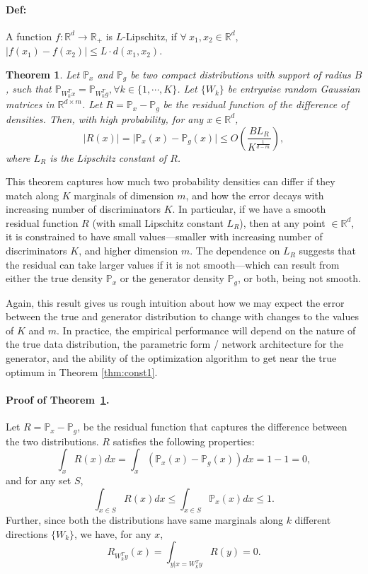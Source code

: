 \documentclass{article}
\newcommand{\R}{\mathbb{R}}
\newtheorem{theorem}{Theorem}[section]
\newcommand{\px}{\mathbb{P}_{x}}
\newcommand{\pg}{\mathbb{P}_{g}}
\newcommand{\pwix}{\mathbb{P}_{W_k^Tx}}
\newcommand{\pwig}{\mathbb{P}_{W_k^Tg}}
\begin{document}
\paragraph{Def:} A function $f: \R^d \to \R_+$ is $L$-Lipschitz, if $\forall~x_1,x_2 \in \R^d$, $\lvert f(x_1) - f(x_2) \rvert \leq L \cdot d(x_1, x_2)$.
\begin{theorem}\label{thm:const2}
Let $\px$ and $\pg$ be two compact distributions with support of radius $B$, such that $\pwix = \pwig, \forall  k \in \{1, \cdots, K\}$. Let $\{ W_k\}$ be entrywise random Gaussian matrices in $\R^{d \times m}$. Let $R =\px -\pg$ be the residual function of the  difference of densities. Then,  with high probability, for any $x \in \R^d$, $$ \lvert R(x) \rvert = \lvert \px(x) -\pg(x)\rvert \leq O\left(\frac{BL_R}{K^{\frac{1}{d-m}}} \right), $$ where $L_R$ is the Lipschitz constant of $R$. 
\end{theorem}
This theorem captures how much two probability densities can differ if they match along $K$ marginals of dimension $m$, and how the error decays with increasing number of discriminators $K$. %
In particular, if we have a smooth residual function $R$ (with small Lipschitz constant $L_R$), then at any point $\in \R^d$, it is constrained to have small values---smaller with increasing number of discriminators $K$, and higher dimension $m$. The dependence on $L_R$ suggests that the residual can take larger values if it is not smooth---which can result from either the true density $\px$ or the generator density $\pg$, or both, being not smooth.

Again, this result gives us rough intuition about how we may expect the error between the true and generator distribution to change with changes to the values of $K$ and $m$. In practice, the empirical performance will depend on the nature of the true data distribution, the parametric form / network architecture for the generator, and the ability of the optimization algorithm to get near the true optimum in Theorem \ref{thm:const1}.

\paragraph{Proof of Theorem~\ref{thm:const2}.}

Let $R = \px -\pg$, be the residual function that captures the difference between the two distributions.  $R$ satisfies the following properties: \begin{equation}  \int_x R(x) dx =  \int_x (\px(x) -\pg(x)) dx = 1 -1 =0, \end{equation} and for any set $S$, \begin{equation}  \int_{x \in S} R(x) dx \leq \int_{x \in S} \px(x) dx \leq 1. \end{equation} Further, since both the distributions have same marginals along $k$ different directions $\{ W_k\}$, we have, for any $x$, \begin{equation*}{R}_{W_k^Ty}(x)= \int_{y | x= W_k^T y} R(y) =0. \end{equation*} 
 
\end{document}
